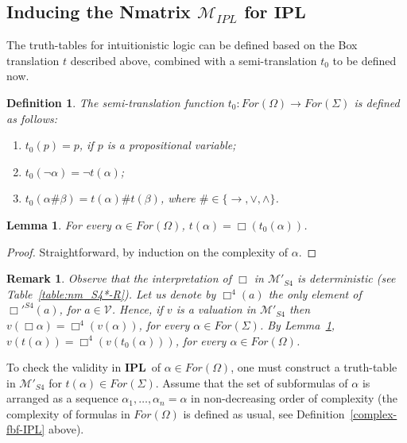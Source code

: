 \documentclass[12pt]{article}
\newtheorem{lemma}[theorem]{Lemma}
\newtheorem{definition}[theorem]{Definition}
\newtheorem{remark}[theorem]{Remark}
\newcommand{\ipl}{\ensuremath{\mathbf{IPL}}}
\begin{document}
\subsection{Inducing the Nmatrix $\mathcal{M}_{IPL}$ for \ipl}

The truth-tables for intuitionistic logic can be defined based on the  Box translation $t$ described above, combined with a semi-translation $t_0$ to be defined now.



\begin{definition}\label{def:h_function}
    The {\em semi-translation function} $t_0 : For(\Omega) \rightarrow For(\Sigma)$ is defined as follows:
    \begin{enumerate}[label=\roman*)]
        \item $t_0(p) = p$, if $p$ is a propositional variable;
        \item $t_0(\neg \alpha) = \neg t(\alpha)$;
        \item $t_0(\alpha \# \beta) = t(\alpha) \# t(\beta)$, where $\# \in \{ \rightarrow, \lor, \land \}$.
    \end{enumerate}
\end{definition}

\begin{lemma}\label{lemma:f_to_h}
    For every $\alpha \in For(\Omega)$, $t(\alpha) = \Box(t_0(\alpha))$.
\end{lemma}
\begin{proof}
Straightforward, by induction on the complexity of $\alpha$.
\end{proof}


\begin{remark}\label{remark:box_s4_deterministic}
Observe that the interpretation of $\Box$ in $\mathcal{M}'_{S4}$ is deterministic  (see Table~\ref{table:nm_S4*-R}). Let us denote by $\Box^4(a)$ the only element of ${\Box'}^{S4}(a)$, for $a \in \mathcal{V}$. Hence, if $v$ is a valuation in $\mathcal{M}'_{S4}$ then $v(\Box \alpha) = \Box^{4}(v(\alpha))$, for every $\alpha \in For(\Sigma)$.  By Lemma~\ref{lemma:f_to_h}, $v(t(\alpha)) = \Box^{4}(v(t_0(\alpha)))$, for every $\alpha \in For(\Omega)$.
\end{remark}


To check the validity in \ipl\ of $\alpha \in For(\Omega)$, one must construct a truth-table in $\mathcal{M}'_{S4}$ for $t(\alpha) \in For(\Sigma)$. Assume that the set of subformulas of $\alpha$ is arranged as a sequence $\alpha_1,\ldots,\alpha_n=\alpha$ in non-decreasing order of complexity (the complexity of formulas in $For(\Omega)$  is defined as usual, see Definition~\ref{complex-fbf-IPL} above).  
\end{document}
